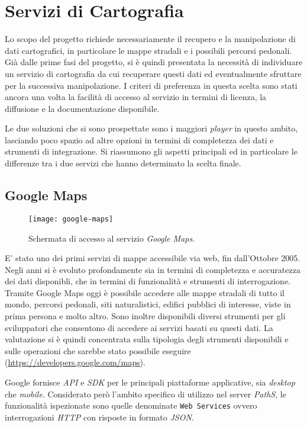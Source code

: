 \section{Servizi di Cartografia}
Lo scopo del progetto richiede necessariamente il recupero e la manipolazione di dati cartografici, in particolare le mappe stradali e i possibili percorsi pedonali. Già dalle prime fasi del progetto, si è quindi presentata la necessità di individuare un servizio di cartografia da cui recuperare questi dati ed eventualmente sfruttare per la successiva manipolazione. I criteri di preferenza in questa scelta sono stati ancora una volta la facilità di accesso al servizio in termini di licenza, la diffusione e la documentazione disponibile.

Le due soluzioni che si sono prospettate sono i maggiori \emph{player} in questo ambito, lasciando poco spazio ad altre opzioni in termini di completezza dei dati e strumenti di integrazione. Si riassumono gli aspetti principali ed in particolare le differenze tra i due servizi che hanno determinato la scelta finale.

\subsection{Google Maps}
\begin{figure}[ht]
  \centering
  \texttt{[image: google-maps]}
  \caption{\footnotesize{Schermata di accesso al servizio \emph{Google Maps}.}}
  \label{fig:google-maps}
\end{figure}
E' stato uno dei primi servizi di mappe accessibile via web, fin dall'Ottobre 2005. Negli anni si è evoluto profondamente sia in termini di completezza e accuratezza dei dati disponibli, che in termini di funzionalità e strumenti di interrogazione. Tramite Google Maps oggi è possibile accedere alle mappe stradali di tutto il mondo, percorsi pedonali, siti naturalistici, edifici pubblici di interesse, viste in prima persona e molto altro. Sono inoltre disponibili diversi strumenti per gli sviluppatori che consentono di accedere ai servizi basati su questi dati. La valutazione si è quindi concentrata sulla tipologia degli strumenti disponibili e sulle operazioni che sarebbe stato possibile eseguire (\url{https://developers.google.com/maps}).

Google fornisce \emph{API} e \emph{SDK} per le principali piattaforme applicative, sia \emph{desktop} che \emph{mobile}. Considerato però l'ambito specifico di utilizzo nel server \emph{PathS}, le funzionalità ispezionate sono quelle denominate \texttt{Web Services} ovvero interrogazioni \emph{HTTP} con risposte in formato \emph{JSON}. 

